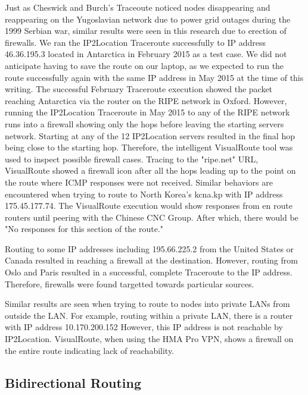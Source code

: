 \documentclass{sigcomm-alternate}
\begin{document}
Just as Cheswick and Burch's Traceoute \cite{ches} noticed nodes disappearing and reappearing on the Yugoslavian network due to power grid outages during the 1999 Serbian war, similar results were seen in this research due to erection of firewalls. We ran the IP2Location Traceroute successfully to IP address 46.36.195.3 located in Antarctica in February 2015 as a test case. We did not anticipate having to save the route on our laptop, as we expected to run the route successfully again with the same IP address in May 2015 at the time of this writing. The successful February Traceroute execution showed the packet reaching Antarctica via the router on the RIPE network in Oxford. However, running the IP2Location Traceroute in May 2015 to any of the RIPE network runs into a firewall showing only the hops before leaving the starting servers network. Starting at any of the 12 IP2Location servers resulted in the final hop being close to the starting hop. Therefore, the intelligent VisualRoute tool was used to inspect possible firewall cases. Tracing to the "ripe.net" URL, VisualRoute showed a firewall icon after all the hops leading up to the point on the route where ICMP responses were not received. Similar behaviors are encountered when trying to route to North Korea's kcna.kp with IP address 175.45.177.74. The VisualRoute execution would show responses from en route routers until peering with the Chinese CNC Group. After which, there would be "No responses for this section of the route."


Routing to some IP addresses including 195.66.225.2 from the United States or Canada resulted in reaching a firewall at the destination. However, routing from Oslo and Paris resulted in a successful, complete Traceroute to the IP address. Therefore, firewalls were found targetted towards particular sources.

Similar results are seen when trying to route to nodes into private LANs from outside the LAN. For example, routing within a private LAN,
there is a router with IP address 10.170.200.152 However, this IP address is not reachable by IP2Location. VisualRoute, when using the HMA Pro VPN, shows a firewall on the entire route indicating lack of reachability.
\subsection{Bidirectional Routing}
\end{document}

